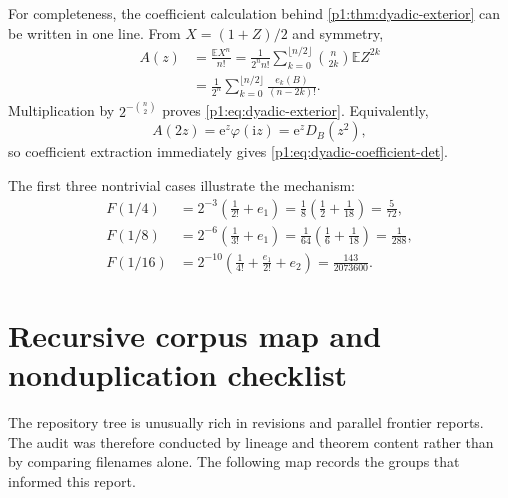 \documentclass[11pt,oneside]{article}
\theoremstyle{definition}
\newcommand{\e}{\mathrm e}
\newcommand{\ii}{\mathrm i}
\newcommand{\E}{\mathbb E}
\newcommand{\phiF}{\varphi}
\begin{document}
For completeness, the coefficient calculation behind \cref{p1:thm:dyadic-exterior} can
be written in one line.  From \(X=(1+Z)/2\) and symmetry,
\begin{align*}
 [z^n]A(z)
 &=\frac{\E X^n}{n!}
 =\frac1{2^nn!}\sum_{k=0}^{\lfloor n/2\rfloor}
   \binom n{2k}\E Z^{2k}\\
 &=\frac1{2^n}\sum_{k=0}^{\lfloor n/2\rfloor}
   \frac{e_k(B)}{(n-2k)!}.
\end{align*}
Multiplication by \(2^{-\binom n2}\) proves \eqref{p1:eq:dyadic-exterior}.  Equivalently,
\begin{equation}
 A(2z)=\e^z\phiF(\ii z)=\e^zD_B(z^2),
 \label{p1:eq:A2z-det}
\end{equation}
so coefficient extraction immediately gives \eqref{p1:eq:dyadic-coefficient-det}.

The first three nontrivial cases illustrate the mechanism:
\begin{align}
 F(1/4)
 &=2^{-3}\left(\frac1{2!}+e_1\right)
 =\frac18\left(\frac12+\frac1{18}\right)=\frac5{72},
 \label{p1:eq:case-n2}\\
 F(1/8)
 &=2^{-6}\left(\frac1{3!}+e_1\right)
 =\frac1{64}\left(\frac16+\frac1{18}\right)=\frac1{288},
 \label{p1:eq:case-n3}\\
 F(1/16)
 &=2^{-10}\left(\frac1{4!}+\frac{e_1}{2!}+e_2\right)
 =\frac{143}{2073600}.
 \label{p1:eq:case-n4}
\end{align}

\section{Recursive corpus map and nonduplication checklist}
\label{p1:app:corpus}

The repository tree is unusually rich in revisions and parallel frontier reports.  The
audit was therefore conducted by lineage and theorem content rather than by comparing
filenames alone.  The following map records the groups that informed this report.
\end{document}
